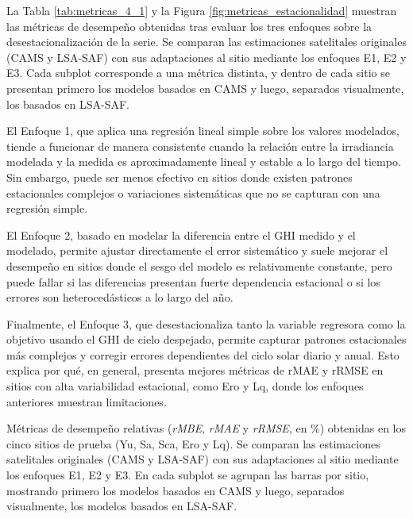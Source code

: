 \documentclass[letterpaper,12pt, twoside]{report}
\providecommand{\DIFdeltex}[1]{{\protect\color{red} \scriptsize #1}} %
\providecommand{\DIFdelFL}[1]{\DIFdel{#1}} %
\providecommand{\DIFdel}[1]{\texorpdfstring{\DIFdeltex{#1}}{}} %
\begin{document}

\DIFdel{La Tabla \ref{tab:metricas_4_1} y la Figura \ref{fig:metricas_estacionalidad} muestran las métricas de desempeño obtenidas tras evaluar los tres enfoques sobre la desestacionalización de la serie. Se comparan las estimaciones satelitales originales (CAMS y LSA-SAF) con sus adaptaciones al sitio mediante los enfoques E1, E2 y E3. 
Cada subplot corresponde a una métrica distinta, y dentro de cada sitio se presentan primero los modelos basados en CAMS y luego, separados visualmente, los basados en LSA-SAF. 
}%

\DIFdel{El Enfoque 1, que aplica una regresión lineal simple sobre los valores modelados, tiende a funcionar de manera consistente cuando la relación entre la irradiancia modelada y la medida es aproximadamente lineal y estable a lo largo del tiempo. Sin embargo, puede ser menos efectivo en sitios donde existen patrones estacionales complejos o variaciones sistemáticas que no se capturan con una regresión simple. 
}%

\DIFdel{El Enfoque 2, basado en modelar la diferencia entre el GHI medido y el modelado, permite ajustar directamente el error sistemático y suele mejorar el desempeño en sitios donde el sesgo del modelo es relativamente constante, pero puede fallar si las diferencias presentan fuerte dependencia estacional o si los errores son heterocedásticos a lo largo del año.
}%

\DIFdel{Finalmente, el Enfoque 3, que desestacionaliza tanto la variable regresora como la objetivo usando el GHI de cielo despejado, permite capturar patrones estacionales más complejos y corregir errores dependientes del ciclo solar diario y anual. Esto explica por qué, en general, presenta mejores métricas de rMAE y rRMSE en sitios con alta variabilidad estacional, como Ero y Lq, donde los enfoques anteriores muestran limitaciones.}%

{%
\DIFdelFL{Métricas de desempeño relativas (\textit{rMBE}, \textit{rMAE} y \textit{rRMSE}, en \%) obtenidas en los cinco sitios de prueba (Yu, Sa, Sca, Ero y Lq). 
    Se comparan las estimaciones satelitales originales (CAMS y LSA-SAF) con sus adaptaciones al sitio mediante los enfoques E1, E2 y E3. 
    En cada subplot se agrupan las barras por sitio, mostrando primero los modelos basados en CAMS y luego, separados visualmente, los modelos basados en LSA-SAF.}}
\end{document}
